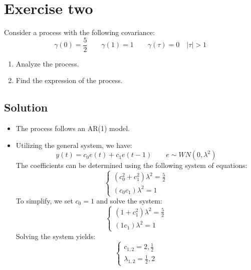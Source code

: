 \section{Exercise two}

Consider a process with the following covariance:
\[\gamma(0)=\dfrac{5}{2}\qquad\gamma(1)=1\qquad\gamma(\tau)=0 \quad \left\lvert \tau \right\rvert > 1\]
\begin{enumerate}
    \item Analyze the process. 
    \item Find the expression of the process. 
\end{enumerate}

\subsection{Solution}
\begin{itemize}
    \item The process follows an AR(1) model.
    \item Utilizing the general system, we have:
        \[y(t)=c_0e(t)+c_1e(t-1)\qquad e\sim WN(0,\lambda^2)\]
        The coefficients can be determined using the following system of equations:
        \[\begin{cases}
            \left(c_0^2+c_1^2\right)\lambda^2 = \frac{5}{2} \\
            \left(c_0c_1\right)\lambda^2= 1
        \end{cases}\]
        To simplify, we set $c_0=1$ and solve the system:
        \[\begin{cases}
            \left(1+c_1^2\right)\lambda^2 = \frac{5}{2} \\
            \left(1c_1\right)\lambda^2= 1
        \end{cases}\]
        Solving the system yields:
        \[\begin{cases}
            c_{1,2} = 2, \frac{1}{2} \\
            \lambda_{1,2} = \frac{1}{2}, 2
        \end{cases}\]
\end{itemize}